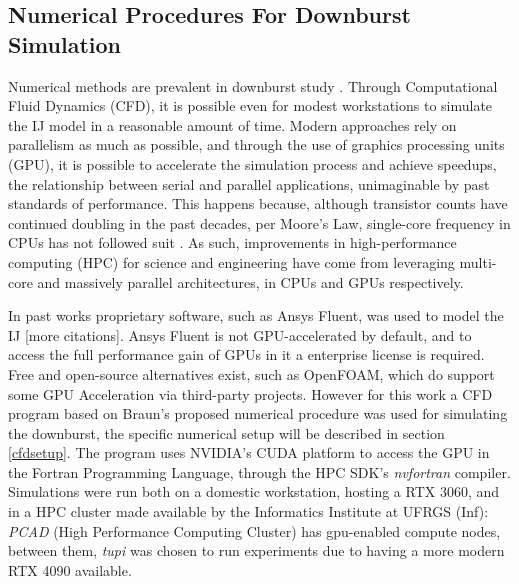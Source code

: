 \documentclass{article}
\begin{document}
\subsection{Numerical Procedures For Downburst Simulation}
Numerical methods are prevalent in downburst study \cite{aboshosha2015} \cite{chay} \cite{chen2007} \cite{kim} \cite{li2012} \cite{mason2009} \cite{mason2010} \cite{proctor1988} \cite{proctor1989} \cite{selvam1992} \cite{vermeire2011cooling} \cite{vermeire2011outflows} \cite{yao2024} \cite{zuzul2024} \cite{haines2018} \cite{sengupta} \cite{sengupta2008loads} \cite{wood2001} \cite{yan2022}. Through Computational Fluid Dynamics (CFD), it is possible even for modest workstations to simulate the IJ model in a reasonable amount of time. Modern approaches rely on parallelism as much as possible, and through the use of graphics processing units (GPU), it is possible to accelerate the simulation process and achieve speedups, the relationship between serial and parallel applications, unimaginable by past standards of performance. This happens because, although transistor counts have continued doubling in the past decades, per Moore's Law, single-core frequency in CPUs has not followed suit \cite{zenodo}. As such, improvements in high-performance computing (HPC) for science and engineering have come from leveraging multi-core and massively parallel architectures, in CPUs and GPUs respectively.

In past works proprietary software, such as Ansys Fluent, was used to model the IJ \cite{kim} [more citations]. Ansys Fluent is not GPU-accelerated by default, and to access the full performance gain of GPUs in it a enterprise license is required. Free and open-source alternatives exist, such as OpenFOAM, which do support some GPU Acceleration via third-party projects. However for this work a CFD program based on Braun's \cite{braun} proposed numerical procedure was used for simulating the downburst, the specific numerical setup will be described in section \ref{cfdsetup}. The program uses NVIDIA's  CUDA platform to access the GPU in the Fortran Programming Language, through the HPC SDK's \textit{nvfortran} compiler. Simulations were run both on a domestic workstation, hosting a RTX 3060, and in a HPC cluster made available by the Informatics Institute at UFRGS (Inf): \textit{PCAD} (High Performance Computing Cluster) has gpu-enabled compute nodes, between them, \textit{tupi} was chosen to run experiments due to having a more modern RTX 4090 available.
\end{document}
